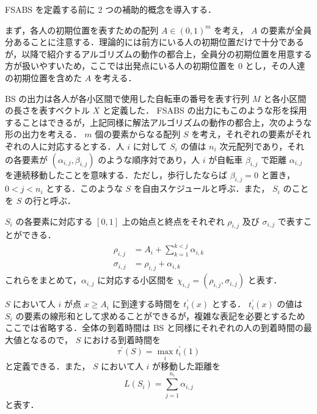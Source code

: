 FSABS を定義する前に 2 つの補助的概念を導入する．

まず，各人の初期位置を表すための配列 $A \in {(0, 1)}^{m}$ を考え， $A$ の要素が全員分あることに注意する．理論的には前方にいる人の初期位置だけで十分であるが，以降で紹介するアルゴリズムの動作の都合上，全員分の初期位置を用意する方が扱いやすいため，ここでは出発点にいる人の初期位置を 0 とし，その人達の初期位置を含めた $A$ を考える．

BS の出力は各人が各小区間で使用した自転車の番号を表す行列 $M$ と各小区間の長さを表すベクトル $X$ と定義した． FSABS の出力にもこのような形を採用することはできるが，上記同様に解法アルゴリズムの動作の都合上，次のような形の出力を考える． $m$ 個の要素からなる配列 $S$ を考え，それぞれの要素がそれぞれの人に対応するとする．人 $i$ に対して $S_i$ の値は $n_i$ 次元配列であり，それの各要素が $(\alpha_{i,j}, \beta_{i,j})$ のような順序対であり，人 $i$ が自転車 $\beta_{i,j}$ で距離 $\alpha_{i,j}$ を連続移動したことを意味する．ただし，歩行したならば $\beta_{i,j} = 0$ と置き， $0 < j < n_i$ とする．このような $S$ を自由スケジュールと呼ぶ．また， $S_i$ のことを $S$ の行と呼ぶ．

$S_i$ の各要素に対応する $[0, 1]$ 上の始点と終点をそれぞれ $\rho_{i,j}$ 及び $\sigma_{i,j}$ で表すことができる．
\begin{align}
  \rho_{i,j} &= A_i + \sum_{k=1}^{k < j}\alpha_{i, k} \\
  \sigma_{i,j} &= \rho_{i,j} + \alpha_{i, k}
\end{align}
これらをまとめて，$\alpha_{i,j}$ に対応する小区間を $\chi_{i,j} = (\rho_{i,j}, \sigma_{i,j})$ と表す．

$S$ において人 $i$ が点 $x \geq A_i$ に到達する時間を $t^{\prime}_i(x)$ とする． $t^{\prime}_i(x)$ の値は $S_i$ の要素の線形和として求めることができるが，複雑な表記を必要とするためここでは省略する．全体の到着時間は BS と同様にそれぞれの人の到着時間の最大値となるので， $S$ における到着時間を
\begin{equation}
  \tau^\prime(S) = \max_i t^{\prime}_i(1)
\end{equation}
と定義できる．また， $S$ において人 $i$ が移動した距離を
\begin{equation}
  L(S_i) = \sum_{j=1}^{n_i} \alpha_{i,j}
\end{equation}
と表す．

